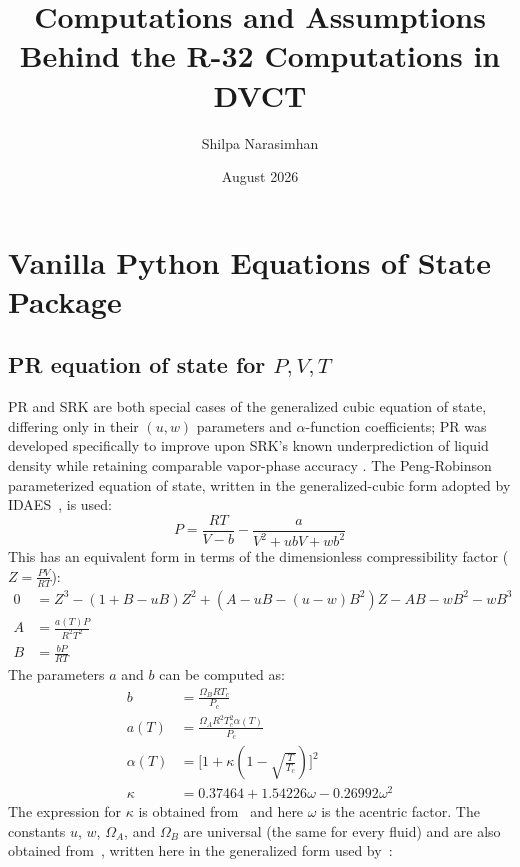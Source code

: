 \documentclass{article}
\title{Computations and Assumptions Behind the R-32 Computations in DVCT}
\author{Shilpa Narasimhan}
\date{August 2026}
\begin{document}
\maketitle
\section{Vanilla Python Equations of State Package}\label{sec:vanilla_pkg}
\subsection{PR equation of state for $P,V,T$}\label{sec:pr_pvt}
PR and SRK are both special cases of the generalized cubic equation of state, differing only in their $(u, w)$ parameters and $\alpha$-function coefficients; PR was developed specifically to improve upon SRK's known underprediction of liquid density while retaining comparable vapor-phase accuracy \cite{peng1976,soave1972}. The Peng-Robinson parameterized equation of state, written in the generalized-cubic form adopted by IDAES~\cite{idaes_cubic_eos_2026}, is used:
\begin{equation}\label{eq:PR}
        P = \frac{RT}{V-b} - \frac{a}{V^2 + ubV + wb^2}
\end{equation}
This has an equivalent form in terms of the dimensionless compressibility factor ($Z = \frac{PV}{RT}$):
\begin{subequations}
    \begin{align}
        0&= Z^3 - (1+B-uB)Z^2 + (A-uB-(u-w)B^2)Z - AB - wB^2 - wB^3 \label{eq:cubic_eos}\\
        A& = \frac{a(T) P}{R^2 T^2}\\
        B & = \frac{b P}{RT}
    \end{align}
\end{subequations}
The parameters $a$ and $b$ can be computed as:
\begin{equation}
\begin{aligned}
b &= \frac{\Omega_B RT_c}{P_c}\\
a(T) & = \frac{\Omega_A R^2 T_c^2 \alpha(T)}{P_c}\\
\alpha(T) & = \Bigg[1 + \kappa (1-\sqrt{\frac{T}{T_c}})\Bigg]^2\\
\kappa &= 0.37464 + 1.54226\omega -0.26992\omega^2
\end{aligned}
\end{equation}
The expression for $\kappa$ is obtained from~\cite{peng1976} and here $\omega$ is the acentric factor. The constants $u$, $w$, $\Omega_A$, and $\Omega_B$ are universal (the same for every fluid) and are also obtained from~\cite{peng1976}, written here in the generalized form used by~\cite{idaes_cubic_eos_2026}:
\end{document}

